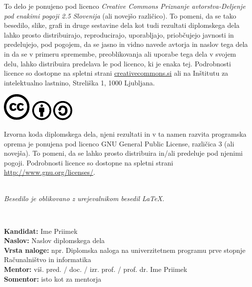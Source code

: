 \documentclass[a4paper,12pt,openright]{book}
\newcommand{\clearemptydoublepage}{\newpage{\pagestyle{empty}\cleardoublepage}}
\newcommand{\CcImageCc}[1]{%
	\includegraphics[scale=#1]{cc_cc_30.pdf}%
}
\newcommand{\CcImageBy}[1]{%
	\includegraphics[scale=#1]{cc_by_30.pdf}%
}
\newcommand{\CcImageSa}[1]{%
	\includegraphics[scale=#1]{cc_sa_30.pdf}%
}
\begin{document}
\newpage
\thispagestyle{empty}

\vspace*{5cm}
{\small \noindent
To delo je ponujeno pod licenco \textit{Creative Commons Priznanje avtorstva-Deljenje pod enakimi pogoji 2.5 Slovenija} (ali novej\v so razli\v cico).
To pomeni, da se tako besedilo, slike, grafi in druge sestavine dela kot tudi rezultati diplomskega dela lahko prosto distribuirajo,
reproducirajo, uporabljajo, priobčujejo javnosti in predelujejo, pod pogojem, da se jasno in vidno navede avtorja in naslov tega
dela in da se v primeru spremembe, preoblikovanja ali uporabe tega dela v svojem delu, lahko distribuira predelava le pod
licenco, ki je enaka tej.
Podrobnosti licence so dostopne na spletni strani \href{http://creativecommons.si}{creativecommons.si} ali na Inštitutu za
intelektualno lastnino, Streliška 1, 1000 Ljubljana.

\vspace*{1cm}
\begin{center}%
\CcImageCc{0.741573033707865}\hspace*{1ex}\CcImageBy{1}\hspace*{1ex}\CcImageSa{1}%
\end{center}
}

\vspace*{1cm}
{\small \noindent
Izvorna koda diplomskega dela, njeni rezultati in v ta namen razvita programska oprema je ponujena pod licenco GNU General Public License,
različica 3 (ali novejša). To pomeni, da se lahko prosto distribuira in/ali predeluje pod njenimi pogoji.
Podrobnosti licence so dostopne na spletni strani \url{http://www.gnu.org/licenses/}.
}

\vfill
\begin{center} 
\ \\ \vfill
{\em
Besedilo je oblikovano z urejevalnikom besedil \LaTeX.}
\end{center}

\clearemptydoublepage

\thispagestyle{empty}
\
\vfill

\bigskip
\noindent\textbf{Kandidat:} Ime Priimek\\
\noindent\textbf{Naslov:} Naslov diplomskega dela\\
\noindent\textbf{Vrsta naloge:} npr. Diplomska naloga na univerzitetnem programu prve stopnje Računalništvo in informatika \\
\noindent\textbf{Mentor:} viš. pred. / doc. / izr. prof. / prof. dr. Ime Priimek\\
\noindent\textbf{Somentor:} isto kot za mentorja
\end{document}
